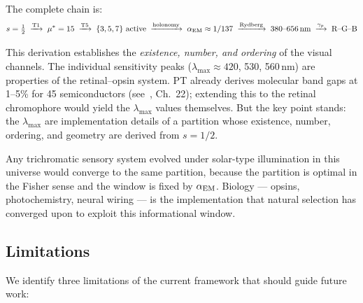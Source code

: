 \documentclass[12pt,a4paper]{article}
\begin{document}
The complete chain is:
\begin{equation}
  s = \tfrac{1}{2}
  \;\xrightarrow{\text{T1}}\;
  {\mu^{*}} = 15
  \;\xrightarrow{\text{T5}}\;
  \{3,5,7\} \text{ active}
  \;\xrightarrow{\text{holonomy}}\;
  \alpha_{\mathrm{EM}} \approx 1/137
  \;\xrightarrow{\text{Rydberg}}\;
  380\text{--}656\,\text{nm}
  \;\xrightarrow{\gamma_{p}}\;
  \text{R--G--B}
  \label{eq:chain}
\end{equation}

\begin{remark}
This derivation establishes the \emph{existence, number, and
ordering} of the visual channels. The individual sensitivity peaks
($\lambda_{\max} \approx 420$, 530, 560\,nm) are properties of the
retinal--opsin system. PT already derives molecular band gaps at
1--5\% for 45 semiconductors (see~\cite{senez2026math}, Ch.~22);
extending this to the retinal chromophore would yield the
$\lambda_{\max}$ values themselves. But the key point stands: the
$\lambda_{\max}$ are implementation details of a partition whose
existence, number, ordering, and geometry are derived from $s = 1/2$.
\end{remark}

\begin{remark}
Any trichromatic sensory system evolved under solar-type illumination
in this universe would converge to the same partition, because the
partition is optimal in the Fisher sense and the window is fixed by
$\alpha_{\mathrm{EM}}$. Biology --- opsins, photochemistry, neural wiring --- is
the implementation that natural selection has converged upon to
exploit this informational window.
\end{remark}

\subsection{Limitations}

We identify three limitations of the current framework that should
guide future work:
\end{document}
